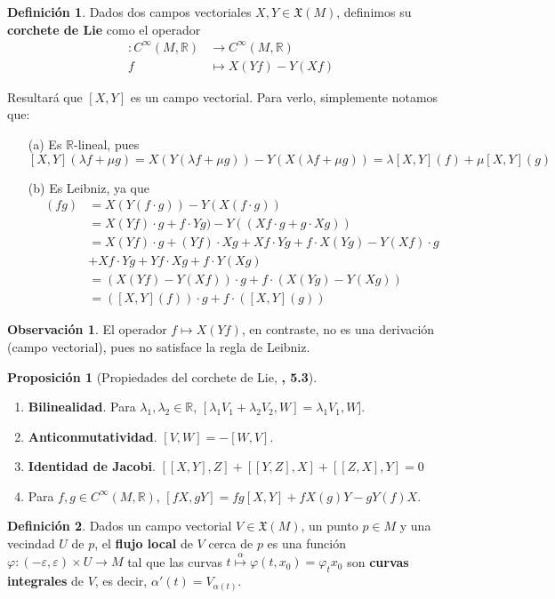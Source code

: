 \documentclass[spanish]{book}
\theoremstyle{definition}
\newtheorem*{defn}{Definición}
\newtheorem*{prop}{Proposición}
\newtheorem*{obs}{Observación}
\newcommand{\R}{\mathbb{R}}
\newcommand{\X}{\mathfrak{X}}
\newcommand{\Cinf}{C^\infty}
\begin{document}
\begin{defn}
	Dados dos campos vectoriales $X,Y\in\X(M)$, definimos su \textbf{corchete de Lie} como el operador 
	\begin{align*}
		[X,Y]:\Cinf(M,\R)&\to\Cinf(M,\R)\\
		f&\mapsto X(Yf)-Y(Xf)
	\end{align*}
\end{defn}
Resultará que $[X,Y]$ es un campo vectorial. Para verlo, simplemente notamos que:
\begin{enumerate}
	\item [(a)] Es $\R$-lineal, pues
	\[[X,Y](\lambda f+\mu g)=X(Y(\lambda f+\mu g))-Y(X(\lambda f+\mu g))=\lambda[X,Y](f)+\mu[X,Y](g)\]
	\item[(b)] Es Leibniz, ya que
	\begin{align*}
		[X,Y](fg)&=X(Y(f\cdot g))-Y(X(f\cdot g))\\
		&=X(Yf)\cdot g+f\cdot Yg)-Y((Xf\cdot g+g\cdot Xg))\\
		&=X(Yf)\cdot g+(Yf)\cdot Xg+Xf\cdot Yg+f\cdot X(Yg)-Y(Xf)\cdot g\\
		&+Xf\cdot Yg+Yf\cdot Xg+f\cdot Y(Xg)\\
		&=(X(Yf)-Y(Xf))\cdot g+f\cdot (X(Yg)-Y(Xg))\\
		&=([X,Y](f))\cdot g+f\cdot ([X,Y](g))
	\end{align*}
\end{enumerate}
\begin{obs}
	El operador $f\mapsto X(Yf)$, en contraste, no es una derivación (campo vectorial), pues no satisface la regla de Leibniz.
\end{obs}
\begin{prop}[Propiedades del corchete de Lie, \cite{DoCarmo}\textbf{, 5.3}]\leavevmode
	\begin{enumerate}
		\item \textbf{Bilinealidad}. Para $\lambda_1,\lambda_2\in\R$, $[\lambda_1V_1+\lambda_2V_2,W]=\lambda_1V_1,W]$.
		\item \textbf{Anticonmutatividad}. $[V,W]=-[W,V]$.
		\item \textbf{Identidad de Jacobi}. $[[X,Y],Z]+[[Y,Z],X]+[[Z,X],Y]=0$
		\item Para $f,g\in\Cinf(M,\R)$, $[fX,gY]=fg[X,Y]+fX(g)Y-gY(f)X$.
	\end{enumerate}
\end{prop}
\begin{defn}
	Dados un campo vectorial $V\in\X(M)$, un punto $p\in M$ y una vecindad $U$ de $p$, el \textbf{flujo local} de $V$ cerca de $p$ es una función $\varphi:(-\varepsilon,\varepsilon)\times U\to M$ tal que las curvas $t\overset{\alpha}{\mapsto}\varphi(t,x_0)=\varphi_tx_0$ son \textbf{curvas integrales} de $V$, es decir, $\alpha'(t)=V_{\alpha(t)}$.
\end{defn}
\end{document}
